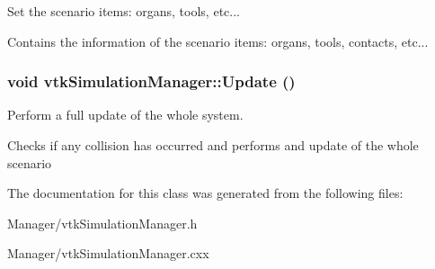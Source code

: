 Set the scenario items: organs, tools, etc... 

Contains the information of the scenario items: organs, tools, contacts, etc... \hypertarget{classvtkSimulationManager_a2d78cb22ac71b2e1e1f549c2df509a60}{
\subsubsection[{Update}]{\setlength{\rightskip}{0pt plus 5cm}void vtkSimulationManager::Update ()}}
\label{classvtkSimulationManager_a2d78cb22ac71b2e1e1f549c2df509a60}


Perform a full update of the whole system. 

Checks if any collision has occurred and performs and update of the whole scenario 

The documentation for this class was generated from the following files:\begin{DoxyCompactItemize}
\item 
Manager/vtkSimulationManager.h\item 
Manager/vtkSimulationManager.cxx\end{DoxyCompactItemize}
